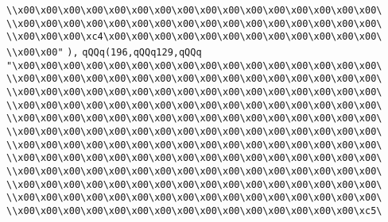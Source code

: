 \verb|\\x00\x00\x00\x00\x00\x00\x00\x00\x00\x00\x00\x00\x00\x00\x00\x00\|\newline
\verb|\\x00\x00\x00\x00\x00\x00\x00\x00\x00\x00\x00\x00\x00\x00\x00\x00\|\newline
\verb|\\x00\x00\x00\xc4\x00\x00\x00\x00\x00\x00\x00\x00\x00\x00\x00\x00\|\newline
\verb|\\x00\x00"|\newline
\verb|),|\newline
\verb|qQQq(196,qQQq129,qQQq|\newline
\verb|"\x00\x00\x00\x00\x00\x00\x00\x00\x00\x00\x00\x00\x00\x00\x00\x00\|\newline
\verb|\\x00\x00\x00\x00\x00\x00\x00\x00\x00\x00\x00\x00\x00\x00\x00\x00\|\newline
\verb|\\x00\x00\x00\x00\x00\x00\x00\x00\x00\x00\x00\x00\x00\x00\x00\x00\|\newline
\verb|\\x00\x00\x00\x00\x00\x00\x00\x00\x00\x00\x00\x00\x00\x00\x00\x00\|\newline
\verb|\\x00\x00\x00\x00\x00\x00\x00\x00\x00\x00\x00\x00\x00\x00\x00\x00\|\newline
\verb|\\x00\x00\x00\x00\x00\x00\x00\x00\x00\x00\x00\x00\x00\x00\x00\x00\|\newline
\verb|\\x00\x00\x00\x00\x00\x00\x00\x00\x00\x00\x00\x00\x00\x00\x00\x00\|\newline
\verb|\\x00\x00\x00\x00\x00\x00\x00\x00\x00\x00\x00\x00\x00\x00\x00\x00\|\newline
\verb|\\x00\x00\x00\x00\x00\x00\x00\x00\x00\x00\x00\x00\x00\x00\x00\x00\|\newline
\verb|\\x00\x00\x00\x00\x00\x00\x00\x00\x00\x00\x00\x00\x00\x00\x00\x00\|\newline
\verb|\\x00\x00\x00\x00\x00\x00\x00\x00\x00\x00\x00\x00\x00\x00\x00\x00\|\newline
\verb|\\x00\x00\x00\x00\x00\x00\x00\x00\x00\x00\x00\x00\x00\x00\x00\xc5\|\newline

